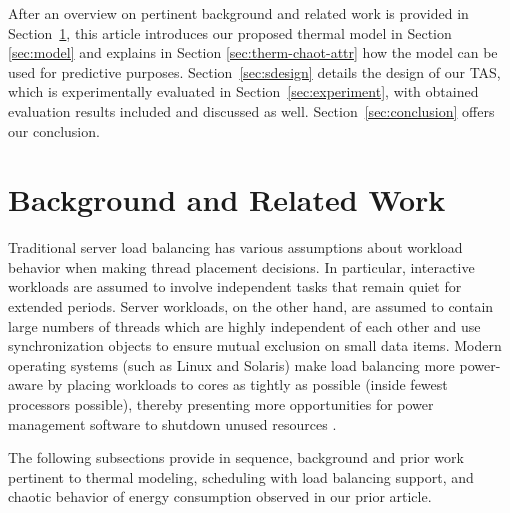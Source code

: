 \documentclass[times, 10pt,twocolumn]{IEEEtran}
\begin{document}
After an overview on pertinent background and related work is provided
in Section~\ref{sec:related}, this article introduces our proposed
thermal model in Section \ref{sec:model} and explains in Section
\ref{sec:therm-chaot-attr} how the model can be used for predictive
purposes.  Section~\ref{sec:sdesign} details the design of our TAS,
which is experimentally evaluated in Section~\ref{sec:experiment}, with
obtained evaluation results included and discussed as well.
Section~\ref{sec:conclusion} offers our conclusion.

\section{Background and Related Work}
\label{sec:related}
Traditional server load balancing has
various assumptions about workload behavior when making thread placement
decisions.  In particular, interactive workloads are assumed to involve
independent tasks that remain quiet for extended periods.  Server
workloads, on the other hand, are assumed to contain large numbers of
threads which are highly independent of each other and use
synchronization objects to ensure mutual exclusion on small data items.
Modern operating systems (such as Linux and Solaris) make load balancing
more power-aware by placing workloads to cores as tightly as possible
(inside fewest processors possible), thereby presenting more
opportunities for power management software to shutdown unused resources
\cite{Sun2009,Xia2010}.

The following subsections provide in sequence, background and prior work
pertinent to thermal modeling, scheduling with load balancing support,
and chaotic behavior of energy consumption observed in our prior
article.
\end{document}
